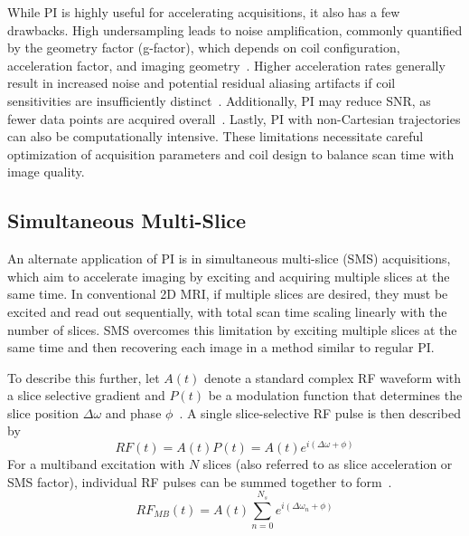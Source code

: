 While PI is highly useful for accelerating acquisitions, it also has a few drawbacks. High undersampling leads to noise amplification, commonly quantified by the geometry factor (g-factor), which depends on coil configuration, acceleration factor, and imaging geometry~\cite{blaimerSMASHSENSEPILS2004}. Higher acceleration rates generally result in increased noise and potential residual aliasing artifacts if coil sensitivities are insufficiently distinct~\cite{blaimerSMASHSENSEPILS2004}. Additionally, PI may reduce SNR, as fewer data points are acquired overall~\cite{blaimerSMASHSENSEPILS2004}. Lastly, PI with non-Cartesian trajectories can also be computationally intensive. These limitations necessitate careful optimization of acquisition parameters and coil design to balance scan time with image quality.

\subsection{Simultaneous Multi-Slice}\label{sec:sms}

An alternate application of PI is in simultaneous multi-slice (SMS) acquisitions, which aim to accelerate imaging by exciting and acquiring multiple slices at the same time. In conventional 2D MRI, if multiple slices are desired, they must be excited and read out sequentially, with total scan time scaling linearly with the number of slices. SMS overcomes this limitation by exciting multiple slices at the same time and then recovering each image in a method similar to regular PI\@.

To describe this further, let $A(t)$ denote a standard complex RF waveform with a slice selective gradient and $P(t)$ be a modulation function that determines the slice position $\Delta\omega$ and phase $\phi$~\cite{barthSimultaneousMultisliceSMS2016a}. A single slice-selective RF pulse is then described by
\begin{equation}
    RF(t) = A(t) P(t)= A(t) e^{i(\Delta \omega + \phi)} 
    \label{eq:excitation}
\end{equation}
For a multiband excitation with $N$ slices (also referred to as slice acceleration or SMS factor), individual RF pulses can be summed together to form~\cite{barthSimultaneousMultisliceSMS2016a}.
\begin{equation}
    RF_{MB}(t) = A(t) \sum_{n=0}^{N_s} e^{i(\Delta \omega_n + \phi)} 
    \label{eq:multiband_ex_intro}
\end{equation}

